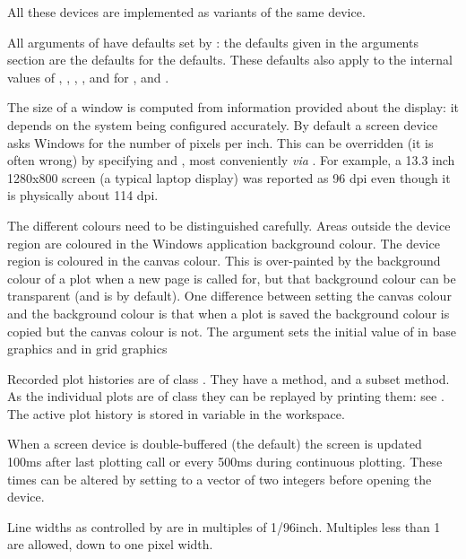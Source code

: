\begin{Details}\relax
All these devices are implemented as variants of the same device.

All arguments of  have defaults set by
: the defaults given in the arguments section
are the defaults for the defaults.  These defaults also apply to the
internal values of , , ,
,  and  for
,  and .

The size of a window is computed from information provided about the
display: it depends on the system being configured accurately.
By default a screen device asks Windows for the number of pixels per
inch.  This can be overridden (it is often wrong) by specifying
 and , most conveniently \emph{via}
.  For example, a 13.3 inch 1280x800
screen (a typical laptop display) was reported as 96 dpi even though
it is physically about 114 dpi.

The different colours need to be distinguished carefully.  Areas
outside the device region are coloured in the Windows application background
colour.  The device region is coloured in the canvas colour.  This is
over-painted by the background colour of a plot when a new page is
called for, but that background colour can be transparent (and is by
default).  One difference between setting the canvas colour and the
background colour is that when a plot is saved the background
colour is copied but the canvas colour is not.  The argument 
sets the initial value of  in base graphics and
 in grid graphics

Recorded plot histories are of class .  They have a
 method, and a subset method.  As the individual plots are
of class  they can be replayed by printing them:
see .  The active plot history is stored in
variable  in the workspace.

When a screen device is double-buffered (the default) the
screen is updated 100ms after last plotting call or every 500ms during
continuous plotting.  These times can be altered by setting
 to a vector of two integers before
opening the device.

Line widths as controlled by  are in multiples of
1/96inch.  Multiples less than 1 are allowed, down to one pixel width.


\end{Details}
